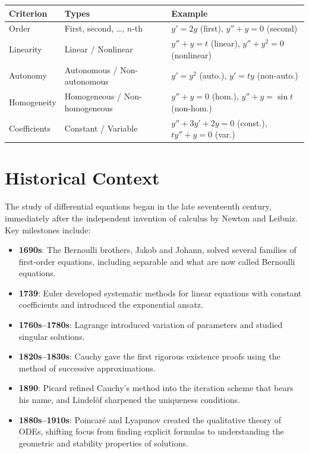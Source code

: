 \documentclass[12pt,a4paper,openany]{book}
\theoremstyle{definition}
\theoremstyle{plain}
\theoremstyle{remark}
\begin{document}
\begin{center}
\begin{tabular}{@{}lll@{}}
\toprule
\textbf{Criterion} & \textbf{Types} & \textbf{Example} \\
\midrule
Order & First, second, \ldots, $n$-th & $y'=2y$ (first), $y''+y=0$ (second) \\
Linearity & Linear / Nonlinear & $y''+y=t$ (linear), $y''+y^2=0$ (nonlinear) \\
Autonomy & Autonomous / Non-autonomous & $y'=y^2$ (auto.), $y'=ty$ (non-auto.) \\
Homogeneity & Homogeneous / Non-homogeneous & $y''+y=0$ (hom.), $y''+y=\sin t$ (non-hom.) \\
Coefficients & Constant / Variable & $y''+3y'+2y=0$ (const.), $ty''+y=0$ (var.) \\
\bottomrule
\end{tabular}
\end{center}

\section{Historical Context}
\label{sec:history}

The study of differential equations began in the late seventeenth century, immediately after the independent invention of calculus by Newton and Leibniz. Key milestones include:

\begin{itemize}[leftmargin=1.5cm]
  \item \textbf{1690s}: The Bernoulli brothers, Jakob and Johann, solved several families of first-order equations, including separable and what are now called Bernoulli equations.
  \item \textbf{1739}: Euler developed systematic methods for linear equations with constant coefficients and introduced the exponential ansatz.
  \item \textbf{1760s--1780s}: Lagrange introduced variation of parameters and studied singular solutions.
  \item \textbf{1820s--1830s}: Cauchy gave the first rigorous existence proofs using the method of successive approximations.
  \item \textbf{1890}: Picard refined Cauchy's method into the iteration scheme that bears his name, and Lindel\"of sharpened the uniqueness conditions.
  \item \textbf{1880s--1910s}: Poincar\'e and Lyapunov created the qualitative theory of ODEs, shifting focus from finding explicit formulas to understanding the geometric and stability properties of solutions.
\end{itemize}
\end{document}
